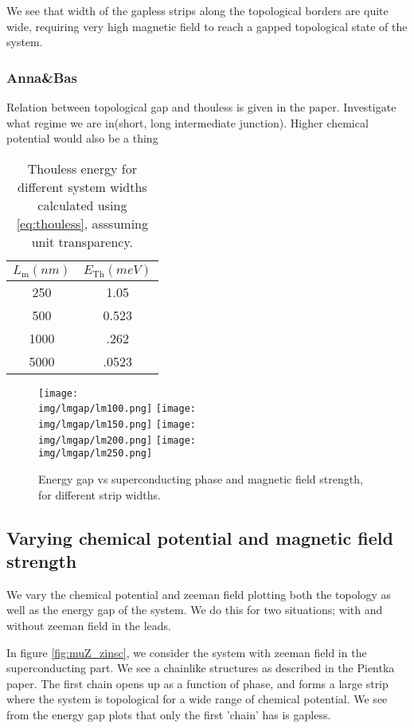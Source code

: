 \documentclass[10pt,a4paper]{article}
\newcommand{\img}{./images}
\begin{document}
	 We see that width of the gapless strips along the topological borders are quite wide, requiring very high magnetic field to reach a gapped topological state of the system.
 	\subsubsection{Anna\&Bas}
 	Relation between topological gap and thouless is given in the paper. Investigate what regime we are in(short, long intermediate junction). Higher chemical potential would also be a thing
	\begin{table}[H]
		\centering
		\begin{tabular}{|c|c|}
			\hline 
			$L_\text{m} (nm)$ & $E_\text{Th} (meV)$ \\ 
			\hline 
			250 & 1.05 \\ 
			\hline 
			500 & 0.523 \\ 
			\hline 
			1000 & .262 \\ 
			\hline 
			5000 & .0523 \\ 
			\hline 
		\end{tabular} 
		\caption{Thouless energy for different system widths calculated using \ref{eq:thouless}, asssuming unit transparency.}
		\label{table:thouless}
	\end{table}
	
	
	\begin{figure}[H]
		\texttt{[image: \\img/lmgap/lm100.png]}
		\texttt{[image: \\img/lmgap/lm150.png]}
		\texttt{[image: \\img/lmgap/lm200.png]}
		\texttt{[image: \\img/lmgap/lm250.png]}
		\caption{Energy gap vs superconducting phase and magnetic field strength, for different strip widths.}
		\label{fig:lmZPgap}
	\end{figure}
\newpage	
	\subsection{Varying chemical potential and magnetic field strength}
		We vary the chemical potential and zeeman field plotting both the topology as well as the energy gap of the system. We do this for two situations; with and without zeeman field in the leads. 
		
		In figure \ref{fig:muZ_zinsc}, we consider the system with zeeman field in the superconducting part. We see a chainlike structures as described in the Pientka paper. The first chain opens up as a function of phase, and forms a large strip where the system is topological for a wide range of chemical potential. We see from the energy gap plots that only the first 'chain' has is gapless.
		
\end{document}
